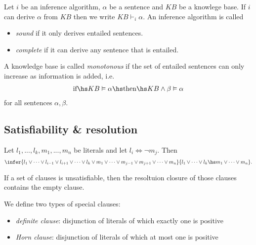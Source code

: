 \documentclass{article}
\begin{document}
\begin{definition}
    Let $i$ be an inference algorithm, $\alpha$ be a sentence and $KB$ be a knowlege base.
    If $i$ can derive $\alpha$ from $KB$ then we write $KB\vdash_i \alpha$.
    An inference algorithm is called
    \begin{itemize}
        \item \emph{sound} if it only derives entailed sentences.
        \item \emph{complete} if it can derive any sentence that is entailed.
    \end{itemize}
\end{definition}


\begin{definition}
    A knowledge base is called \emph{monotonous} if the set of entailed sentences can
    only increase as information is added, i.e.
    \begin{align*}
        \text{if}\hs KB \vDash \alpha \hs\text{then}\hs KB\wedge \beta \vDash \alpha
    \end{align*}
    for all sentences $\alpha,\beta$.
\end{definition}

\subsection{Satisfiability \& resolution}

\begin{theorem}
    Let $l_1,...,l_k,m_1,...,m_n$ be literals and let $l_i\Leftrightarrow\neg m_j$. Then
    \begin{align*}
        \infer{l_1\vee \cdots\vee l_{i-1}\vee l_{i+1}\vee\cdots\vee l_k\vee m_1\vee\cdots\vee m_{j-1}\vee m_{j+1}\vee \cdots\vee m_n}{
            l_1\vee\cdots \vee l_k\hs m_1\vee\cdots\vee m_n
        }.
    \end{align*}
\end{theorem}

\begin{theorem}
    If a set of clauses is unsatisfiable, then the resoltuion closure of
    those clauses contains the empty clause. 
\end{theorem}

\begin{definition}
    We define two types of special clauses:
    \begin{itemize}
        \item \emph{definite clause}: disjunction of literals of which exactly one is positive
        \item \emph{Horn clause}: disjunction of literals of which at most one is positive
    \end{itemize}
\end{definition}
\end{document}
